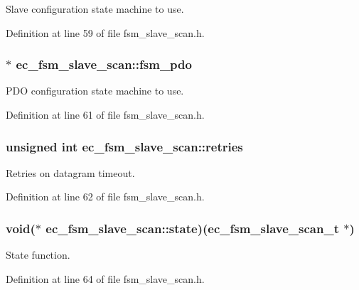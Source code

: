Slave configuration state machine to use. 



Definition at line 59 of file fsm\-\_\-slave\-\_\-scan.\-h.

\subsubsection[{fsm\-\_\-pdo}]{$\ast$ ec\-\_\-fsm\-\_\-slave\-\_\-scan\-::fsm\-\_\-pdo}\label{structec__fsm__slave__scan_adb7c9afd6972b238a744177aaa869dd7}


P\-D\-O configuration state machine to use. 



Definition at line 61 of file fsm\-\_\-slave\-\_\-scan.\-h.

\subsubsection[{retries}]{\setlength{\rightskip}{0pt plus 5cm}unsigned int ec\-\_\-fsm\-\_\-slave\-\_\-scan\-::retries}\label{structec__fsm__slave__scan_a1abcaa2e075365336e45fa216c2a6ac5}


Retries on datagram timeout. 



Definition at line 62 of file fsm\-\_\-slave\-\_\-scan.\-h.

\subsubsection[{state}]{\setlength{\rightskip}{0pt plus 5cm}void($\ast$ ec\-\_\-fsm\-\_\-slave\-\_\-scan\-::state)({\bf ec\-\_\-fsm\-\_\-slave\-\_\-scan\-\_\-t} $\ast$)}\label{structec__fsm__slave__scan_ab3ba7e958f1540f67f21367f96c68c47}


State function. 



Definition at line 64 of file fsm\-\_\-slave\-\_\-scan.\-h.


